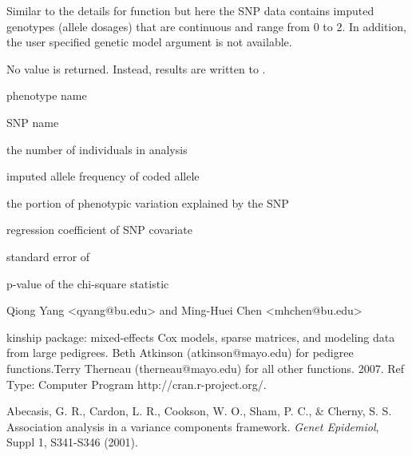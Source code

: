 \begin{Details}\relax
Similar to the details for  function but here the SNP data contains imputed genotypes (allele dosages) 
that are continuous and range from 0 to 2. In addition, the user specified genetic model argument is not available.
\end{Details}
\begin{Value}
No value is returned. Instead, results are written to .

\begin{ldescription}
\item[\code{phen }] phenotype name
\item[\code{snp }] SNP name
\item[\code{N }] the number of individuals in analysis
\item[\code{AF }] imputed allele frequency of coded allele
\item[\code{h2q }] the portion of phenotypic variation explained by the SNP
\item[\code{beta }] regression coefficient of SNP covariate
\item[\code{se }] standard error of 
\item[\code{pval }] p-value of the chi-square statistic
\end{ldescription}
\end{Value}
\begin{Author}\relax
Qiong Yang <qyang@bu.edu> and Ming-Huei Chen <mhchen@bu.edu>
\end{Author}
\begin{References}\relax
kinship package: mixed-effects Cox models, sparse matrices, and modeling data from large pedigrees.
Beth Atkinson (atkinson@mayo.edu) for pedigree functions.Terry Therneau (therneau@mayo.edu) for all other functions.
2007. Ref Type: Computer Program http://cran.r-project.org/. 

Abecasis, G. R., Cardon, L. R., Cookson, W. O., Sham, P. C., \& Cherny, S. S. Association analysis in 
a variance components framework. \emph{Genet Epidemiol},  Suppl 1, S341-S346 (2001).
\end{References}

